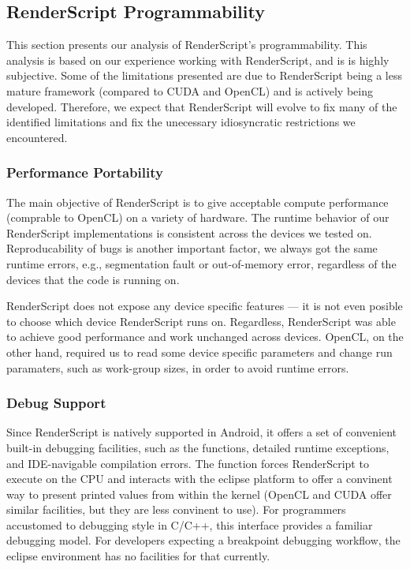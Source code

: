 \subsection{RenderScript Programmability}

This section presents our analysis of RenderScript's programmability.
This analysis is based on our experience working with RenderScript, and is 
  is highly subjective.
Some of the limitations presented are due to RenderScript being a less mature
  framework (compared to CUDA and OpenCL) and is actively being developed.
Therefore, we expect that RenderScript will evolve to fix many of the
identified limitations and fix the unecessary idiosyncratic restrictions we encountered.

\subsubsection{Performance Portability}

The main objective of RenderScript is to give acceptable compute performance
 (comprable to OpenCL) on a variety of hardware.
The runtime behavior of our RenderScript implementations is consistent across
the devices we tested on.
Reproducability of bugs is another important factor, we
always got the same runtime errors, e.g., segmentation fault or out-of-memory
error, regardless of the devices that the code is running on.

RenderScript does not expose any device specific features --- it is not even 
 posible to choose which device RenderScript runs on.
Regardless, RenderScript was able to achieve good performance and work unchanged 
 across devices.
OpenCL, on the other hand, required us to read some device specific parameters
 and change run paramaters, such as work-group sizes, in order to avoid 
 runtime errors.

\subsubsection{Debug Support}

Since RenderScript is natively supported in Android,
it offers a set of convenient built-in debugging
facilities, such as the  functions, detailed runtime exceptions,
and IDE-navigable compilation errors.
The  function forces RenderScript to execute on the CPU and interacts 
with the eclipse platform to offer a convinent way to present printed values from within the kernel
(OpenCL and CUDA offer similar facilities, but they are less convinent to use).
For programmers accustomed to  debugging style in C/C++, this interface provides
a familiar debugging model. For developers expecting a breakpoint debugging workflow, the eclipse
environment has no facilities for that currently.


